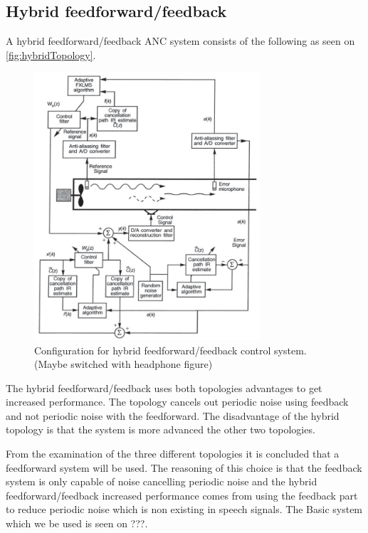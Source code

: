 \subsection*{Hybrid feedforward/feedback}    
A hybrid feedforward/feedback ANC system consists of the following as seen on \autoref{fig:hybridTopology}.
\begin{figure}[H]
	\centering
	\includegraphics[width=0.75\textwidth]{figures/BasicSystem/hybrid}
	\caption{Configuration for hybrid feedforward/feedback control system. (Maybe switched with headphone figure)}
	\label{fig:hybridTopology}
\end{figure}

The hybrid feedforward/feedback uses both topologies advantages to get increased performance. The topology cancels out periodic noise using feedback and not periodic noise with the feedforward. The disadvantage of the hybrid topology is that the system is more advanced the other two topologies.   

From the examination of the three different topologies it is concluded that a feedforward system will be used. The reasoning of this choice is that the feedback system is only capable of noise cancelling periodic noise and the hybrid feedforward/feedback increased performance comes from using the feedback part to reduce periodic noise which is non existing in speech signals. The Basic system which we be used is seen on ???.




